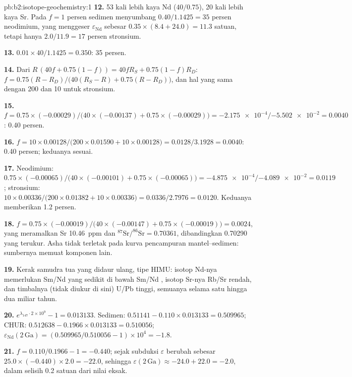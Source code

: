 \begin{solution}{pb:b2:isotope-geochemistry:1}
\textbf{12.} 53 kali lebih kaya Nd ($40/0.75$), 20 kali lebih kaya Sr. Pada $f = 1$ persen
sedimen menyumbang $0.40/1.1425 = 35$ persen neodimium, yang menggeser
$\varepsilon_{\mathrm{Nd}}$ sebesar $0.35\times(8.4 + 24.0) = 11.3$ satuan, tetapi hanya $2.0/11.9 =
17$ persen stronsium.

\textbf{13.} $0.01\times40/1.1425 = 0.350$: 35 persen.

\textbf{14.} Dari $R\,(40f + 0.75(1-f)) = 40fR_S + 0.75(1-f)R_D$:
$f = 0.75(R - R_D)/\bigl(40(R_S - R) + 0.75(R - R_D)\bigr)$, dan hal yang sama dengan 200
dan 10 untuk stronsium.

\textbf{15.} $f = 0.75\times(-0.00029)/\bigl(40\times(-0.00137) + 0.75\times(-0.00029)\bigr)
= \num{-2.175e-4}/\num{-5.502e-2} = 0.0040$: 0.40 persen.

\textbf{16.} $f = 10\times0.00128/\bigl(200\times0.01590 + 10\times0.00128\bigr) =
0.0128/3.1928 = 0.0040$: 0.40 persen; keduanya sesuai.

\textbf{17.} Neodimium: $0.75\times(-0.00065)/\bigl(40\times(-0.00101) +
0.75\times(-0.00065)\bigr) = \num{-4.875e-4}/\num{-4.089e-2} = 0.0119$; stronsium:
$10\times0.00336/\bigl(200\times0.01382 + 10\times0.00336\bigr) = 0.0336/2.7976 = 0.0120$.
Keduanya memberikan 1.2 persen.

\textbf{18.} $f = 0.75\times(-0.00019)/\bigl(40\times(-0.00147) + 0.75\times(-0.00019)\bigr)
= 0.0024$, yang meramalkan Sr \qty{10.46}{ppm} dan $^{87}\mathrm{Sr}/^{86}\mathrm{Sr} =
0.70361$, dibandingkan 0.70290 yang terukur. Asha tidak terletak pada kurva pencampuran mantel--sedimen:
sumbernya memuat komponen lain.

\textbf{19.} Kerak samudra tua yang didaur ulang, tipe HIMU: isotop Nd-nya memerlukan Sm/Nd
yang sedikit di bawah Sm/Nd , isotop Sr-nya Rb/Sr rendah, dan
timbalnya (tidak diukur di sini) U/Pb tinggi, semuanya selama satu hingga dua miliar tahun.

\textbf{20.} $e^{\lambda_{147}\cdot2\times10^9} - 1 = 0.013133$. Sedimen: $0.51141 -
0.110\times0.013133 = 0.509965$; CHUR: $0.512638 - 0.1966\times0.013133 = 0.510056$;
$\varepsilon_{\mathrm{Nd}}(2\,\mathrm{Ga}) = (0.509965/0.510056 - 1)\times10^4 = -1.8$.

\textbf{21.} $f = 0.110/0.1966 - 1 = -0.440$; sejak subduksi $\varepsilon$ berubah sebesar
$25.0\times(-0.440)\times2.0 = -22.0$, sehingga $\varepsilon(2\,\mathrm{Ga}) \approx -24.0 + 22.0
= -2.0$, dalam selisih 0.2 satuan dari nilai eksak.


\end{solution}
